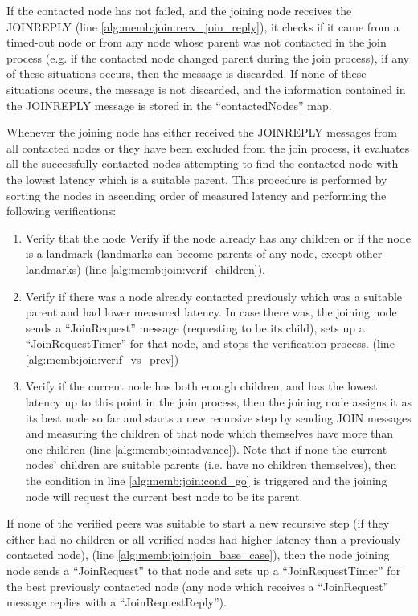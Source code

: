 If the contacted node has not failed, and the joining node receives the JOINREPLY (line \ref{alg:memb:join:recv_join_reply}), it checks if it came from a timed-out node or from any node whose parent was not contacted in the join process (e.g. if the contacted node changed parent during the join process), if any of these situations occurs, then the message is discarded. If none of these situations occurs, the message is not discarded, and the information contained in the JOINREPLY message is stored in the ``contactedNodes'' map.

Whenever the joining node has either received the JOINREPLY messages from all contacted nodes or they have been excluded from the join process, it evaluates all the successfully contacted nodes attempting to find the contacted node with the lowest latency which is a suitable parent. This procedure is performed by sorting the nodes in ascending order of measured latency and performing the following verifications:

\begin{enumerate}
    \item Verify that the node  Verify if the node already has any children or if the node is a landmark (landmarks can become parents of any node, except other landmarks) (line \ref{alg:memb:join:verif_children}). 
    
    \item Verify if there was a node already contacted previously which was a suitable parent and had lower measured latency. In case there was, the joining node sends a ``JoinRequest'' message (requesting to be its child), sets up a ``JoinRequestTimer'' for that node, and stops the verification process. (line \ref{alg:memb:join:verif_vs_prev})

    \item Verify if the current node has both enough children, and has the lowest latency up to this point in the join process, then the joining node assigns it as its best node so far and starts a new recursive step by sending JOIN messages and measuring the children of that node which themselves have more than one children (line \ref{alg:memb:join:advance}). Note that if none the current nodes' children are suitable parents (i.e. have no children themselves), then the condition in line \ref{alg:memb:join:cond_go} is triggered and the joining node will request the current best node to be its parent.
\end{enumerate}

If none of the verified peers was suitable to start a new recursive step (if they either had no children or all verified nodes had higher latency than a previously contacted node), (line \ref{alg:memb:join:join_base_case}), then the node joining node sends a ``JoinRequest'' to that node and sets up a ``JoinRequestTimer'' for the best previously contacted node (any node which receives a ``JoinRequest'' message replies with a ``JoinRequestReply''). 


